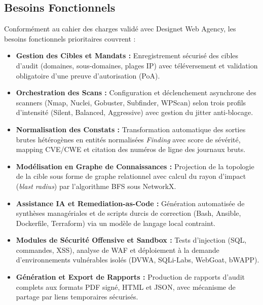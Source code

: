 \subsection{Besoins Fonctionnels}
\par Conform\'ement au cahier des charges valid\'e avec Designet Web Agency, les besoins fonctionnels prioritaires couvrent :
\begin{itemize}
    \item \textbf{Gestion des Cibles et Mandats :} Enregistrement s\'ecuris\'e des cibles d'audit (domaines, sous-domaines, plages IP) avec t\'el\'eversement et validation obligatoire d'une preuve d'autorisation (PoA).
    \item \textbf{Orchestration des Scans :} Configuration et d\'eclenchement asynchrone des scanners (Nmap, Nuclei, Gobuster, Subfinder, WPScan) selon trois profils d'intensit\'e (Silent, Balanced, Aggressive) avec gestion du jitter anti-blocage.
    \item \textbf{Normalisation des Constats :} Transformation automatique des sorties brutes h\'et\'erog\`enes en entit\'es normalis\'ees \textit{Finding} avec score de s\'ev\'erit\'e, mapping CVE/CWE et citation des num\'eros de ligne des journaux bruts.
    \item \textbf{Mod\'elisation en Graphe de Connaissances :} Projection de la topologie de la cible sous forme de graphe relationnel avec calcul du rayon d'impact (\textit{blast radius}) par l'algorithme BFS sous NetworkX.
    \item \textbf{Assistance IA et Remediation-as-Code :} G\'en\'eration automatis\'ee de synth\`eses manag\'eriales et de scripts durcis de correction (Bash, Ansible, Dockerfile, Terraform) via un mod\`ele de langage local contraint.
    \item \textbf{Modules de S\'ecurit\'e Offensive et Sandbox :} Tests d'injection (SQL, commandes, XSS), analyse de WAF et d\'eploiement \`a la demande d'environnements vuln\'erables isol\'es (DVWA, SQLi-Labs, WebGoat, bWAPP).
    \item \textbf{G\'en\'eration et Export de Rapports :} Production de rapports d'audit complets aux formats PDF sign\'e, HTML et JSON, avec m\'ecanisme de partage par liens temporaires s\'ecuris\'es.
\end{itemize}


